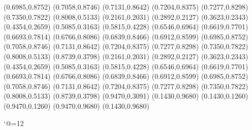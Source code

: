 \PST@Diamond(0.6985,0.8752)
\PST@Diamond(0.7058,0.8746)
\PST@Diamond(0.7131,0.8642)
\PST@Diamond(0.7204,0.8375)
\PST@Diamond(0.7277,0.8298)
\PST@Diamond(0.7350,0.7822)
\PST@Diamond(0.8008,0.5133)
\PST@Diamond(0.2161,0.2031)
\PST@Diamond(0.2892,0.2127)
\PST@Diamond(0.3623,0.2343)
\PST@Diamond(0.4354,0.2659)
\PST@Diamond(0.5085,0.3163)
\PST@Diamond(0.5815,0.4228)
\PST@Diamond(0.6546,0.6964)
\PST@Diamond(0.6619,0.7701)
\PST@Diamond(0.6693,0.7814)
\PST@Diamond(0.6766,0.8086)
\PST@Diamond(0.6839,0.8466)
\PST@Diamond(0.6912,0.8599)
\PST@Diamond(0.6985,0.8752)
\PST@Diamond(0.7058,0.8746)
\PST@Diamond(0.7131,0.8642)
\PST@Diamond(0.7204,0.8375)
\PST@Diamond(0.7277,0.8298)
\PST@Diamond(0.7350,0.7822)
\PST@Diamond(0.8008,0.5133)
\PST@Diamond(0.8739,0.3798)
\PST@Diamond(0.2161,0.2031)
\PST@Diamond(0.2892,0.2127)
\PST@Diamond(0.3623,0.2343)
\PST@Diamond(0.4354,0.2659)
\PST@Diamond(0.5085,0.3163)
\PST@Diamond(0.5815,0.4228)
\PST@Diamond(0.6546,0.6964)
\PST@Diamond(0.6619,0.7701)
\PST@Diamond(0.6693,0.7814)
\PST@Diamond(0.6766,0.8086)
\PST@Diamond(0.6839,0.8466)
\PST@Diamond(0.6912,0.8599)
\PST@Diamond(0.6985,0.8752)
\PST@Diamond(0.7058,0.8746)
\PST@Diamond(0.7131,0.8642)
\PST@Diamond(0.7204,0.8375)
\PST@Diamond(0.7277,0.8298)
\PST@Diamond(0.7350,0.7822)
\PST@Diamond(0.8008,0.5133)
\PST@Diamond(0.8739,0.3798)
\PST@Diamond(0.9470,0.3091)
\PST@Border(0.1430,0.9680)
(0.1430,0.1260)
(0.9470,0.1260)
(0.9470,0.9680)
(0.1430,0.9680)

\catcode`@=12
\fi
\endpspicture
